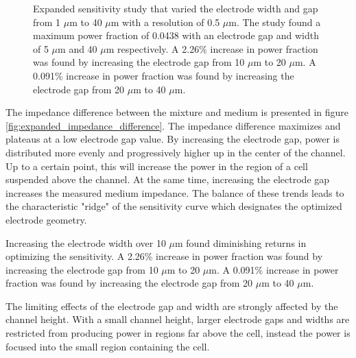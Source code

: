 \begin{figure}[h]
\begin{subfigure}[b]{0.49\textwidth}
    \end{subfigure}
    \caption[Analytic Sensitivity]{Expanded sensitivity study that varied the electrode width and gap from 1 $\mu$m to 40 $\mu$m with a resolution of 0.5 $\mu$m. The study found a maximum power fraction of 0.0438 with an electrode gap and width of 5 $\mu$m  and 40 $\mu$m  respectively. A 2.26\% increase in power fraction was found by increasing the electrode gap from 10 $\mu$m to 20 $\mu$m. A 0.091\% increase in power fraction was found by increasing the electrode gap from 20 $\mu$m to 40 $\mu$m.}
    \label{fig:expanded_power_sensitivity} 
\end{figure}

\par The impedance difference between the mixture and medium is presented in figure \ref{fig:expanded_impedance_difference}. The impedance difference maximizes and plateaus at a low electrode gap value. By increasing the electrode gap, power is distributed more evenly and progressively higher up in the center of the channel. Up to a certain point, this will increase the power in the region of a cell suspended above the channel. At the same time, increasing the electrode gap increases the measured medium impedance. The balance of these trends leads to the characteristic "ridge" of the sensitivity curve which designates the optimized electrode geometry.

\par  Increasing the electrode width over 10 $\mu$m found diminishing returns in optimizing the sensitivity. A 2.26\% increase in power fraction was found by increasing the electrode gap from 10 $\mu$m to 20 $\mu$m. A 0.091\% increase in power fraction was found by increasing the electrode gap from 20 $\mu$m to 40 $\mu$m.

\par The limiting effects of the electrode gap and width are strongly affected by the channel height. With a small channel height, larger electrode gaps and widths are restricted from producing power in regions far above the cell, instead the power is focused into the small region containing the cell. 

